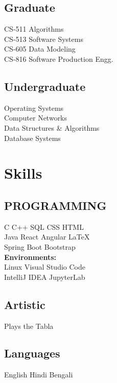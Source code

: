 \documentclass[]{essdee-resume}
\begin{document}
\begin{minipage}[t]{0.33\textwidth}
\subsection{Graduate}
CS-511  Algorithms \\
CS-513  Software Systems \\
CS-605  Data Modeling \\
CS-816 Software Production Engg. \\
\sectionsep

\subsection{Undergraduate}
Operating Systems \\
Computer Networks \\
Data Structures \& Algorithms \\
Database Systems \\



\section{Skills}
\subsection{PROGRAMMING}
C \textbullet{} C++ \textbullet{} SQL \textbullet{} CSS \textbullet{} HTML \\
Java \textbullet{} React \textbullet{} Angular \textbullet{} \LaTeX\  \\
Spring Boot \textbullet{} Bootstrap\\ 
\textbf{Environments:}\\
Linux \textbullet{} Visual Studio Code  \\
IntelliJ IDEA \textbullet{} JupyterLab
\sectionsep

\subsection{Artistic}
Plays the Tabla \\
\sectionsep

\subsection{Languages}
English \textbullet{} Hindi \textbullet{} Bengali \\
\sectionsep



\end{minipage}
\end{document}
